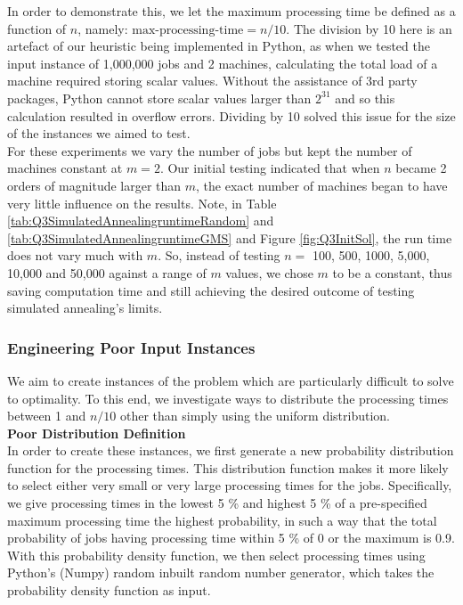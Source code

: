 \documentclass[12pt,a4paper,reqno]{article}
\begin{document}
In order to demonstrate this, we let the maximum processing time be defined as a function of $n$, namely: $\text{max-processing-time}=n/10$. The division by 10 here is an artefact of our heuristic being implemented in Python, as when we tested the input instance of 1,000,000 jobs and 2 machines, calculating the total load of a machine required storing scalar values. Without the assistance of 3rd party packages, Python cannot store scalar values larger than $2^{31}$ and so this calculation resulted in overflow errors. Dividing by 10 solved this issue for the size of the instances we aimed to test. \\

For these experiments we vary the number of jobs but kept the number of machines constant at $m=2$. Our initial testing indicated that when $n$ became 2 orders of magnitude larger than $m$, the exact number of machines began to have very little influence on the results. Note, in Table \ref{tab:Q3SimulatedAnnealingruntimeRandom} and  \ref{tab:Q3SimulatedAnnealingruntimeGMS} and Figure \ref{fig:Q3InitSol}, the run time does not vary much with $m$. So, instead of testing $n=$ 100, 500, 1000, 5,000, 10,000 and 50,000 against a range of $m$ values, we chose $m$ to be a constant, thus saving computation time and still achieving the desired outcome of testing simulated annealing's limits. \\

\subsubsection{Engineering Poor Input Instances}
We aim to create instances of the problem which are particularly difficult to solve to optimality. To this end, we investigate ways to distribute the processing times between 1 and $n/10$ other than simply using the uniform distribution. \\

{\bf Poor Distribution Definition} \\
In order to create these instances, we first generate a new probability distribution function for the processing times. This distribution function makes it more likely to select either very small or very large processing times for the jobs. Specifically, we give processing times in the lowest 5 \% and highest 5 \% of a pre-specified maximum processing time the highest probability, in such a way that the total probability of jobs having processing time within 5 \% of 0 or the maximum is 0.9. With this probability density function, we then select processing times using Python's (Numpy) random inbuilt random number generator, which takes the probability density function as input. \\
\end{document}
